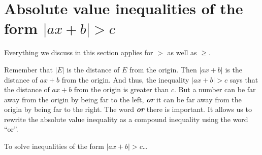 

\section*{Absolute value inequalities of the form $| ax + b | > c$}

\begin{center}
    \begin{tcolorbox}[width=3.5in]
        Everything we discuss in this section applies for $>$ as well as $\geq$.
    \end{tcolorbox}
\end{center}

Remember that $|E|$ is the distance of $E$ from the origin.
Then $| ax + b |$ is the distance of $ax+b$ from the origin.
And thus, the inequality $|ax+b| > c$ says that the distance of $ax+b$ from the origin is greater than $c$.
But a number can be far away from the origin by being far to the left,
{\bfseries\itshape or} it can be far away from the origin by being far to the right.
The word {\bfseries\itshape or} there is important.
It allows us to rewrite the absolute value inequality as a compound inequality using the word ``or''.


\begin{myConceptSteps}{To solve inequalities of the form $| ax + b | > c$\dots}
\end{myConceptSteps}

\begin{center}
\end{center}




